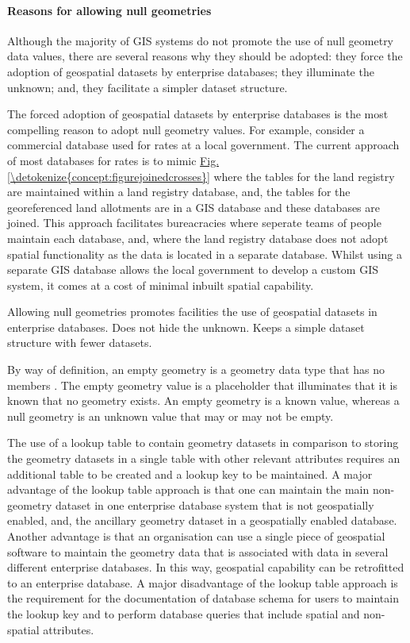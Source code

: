 \documentclass[letterpaper,10pt,english]{sphinxmanual}
\begin{document}
\paragraph{Reasons for allowing null geometries}
\label{\detokenize{concept:reasons-for-allowing-null-geometries}}
Although the majority of GIS systems do not promote the use of null geometry data values, there are several reasons why they should be adopted: they force the adoption of geospatial datasets by enterprise databases; they illuminate the unknown; and, they facilitate a simpler dataset structure.

The forced adoption of geospatial datasets by enterprise databases is the most compelling reason to adopt null geometry values.  For example, consider a commercial database used for rates at a local government.  The current approach of most databases for rates is to mimic \hyperref[\detokenize{concept:figurejoinedcrosses}]{Fig.\@ \ref{\detokenize{concept:figurejoinedcrosses}}} where the tables for the land registry are maintained within a land registry database, and, the tables for the georeferenced land allotments are in a GIS database and these databases are joined.  This approach facilitates bureacracies where seperate teams of people maintain each database, and, where the land registry database does not adopt spatial functionality as the data is located in a separate database.  Whilst using a separate GIS database allows the local government to develop a custom GIS system, it comes at a cost of minimal inbuilt spatial capability.

Allowing null geometries promotes facilities the use of geospatial datasets in enterprise databases.  Does not hide the unknown.  Keeps a simple dataset structure with fewer datasets.

By way of definition, an empty geometry is a geometry data type that has no members .  The empty geometry
value is a placeholder that illuminates that it is known that no geometry exists.  An empty geometry is a known value,
whereas a null geometry is an unknown value that may or may not be empty.

The use of a lookup table to contain geometry datasets in comparison to storing the geometry datasets in a single table with other relevant attributes requires an additional table to be created and a lookup key to be maintained.  A major advantage of the lookup table approach is that one can maintain the main non-geometry dataset in one enterprise database system that is not geospatially enabled, and, the ancillary geometry dataset in a geospatially enabled database.  Another advantage is that an organisation can use a single piece of geospatial software to maintain the geometry data that is associated with data in several different enterprise databases.  In this way, geospatial capability can be retrofitted to an enterprise database.  A major disadvantage of the lookup table approach is the requirement for the documentation of database schema for users to maintain the lookup key and to perform database queries that include spatial and non-spatial attributes.
\end{document}
